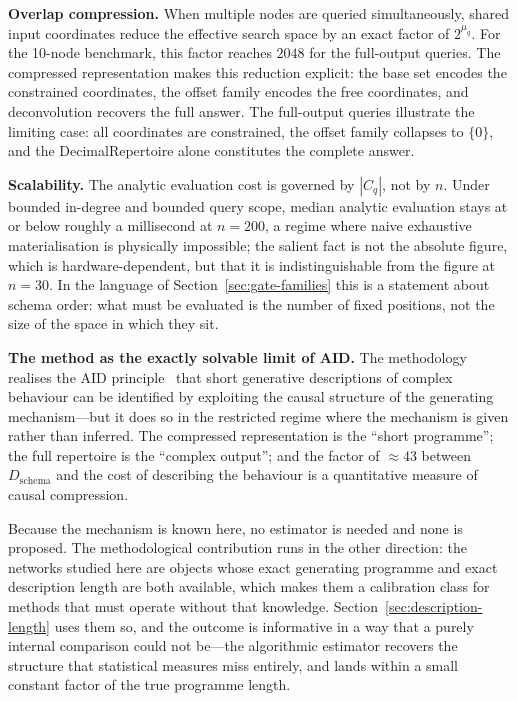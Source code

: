 \documentclass[11pt]{article}
\begin{document}
\textbf{Overlap compression.}  When multiple nodes are queried
simultaneously, shared input coordinates reduce the effective search space
by an exact factor of $2^{\mu_q}$.  For the 10-node benchmark, this factor
reaches $2048$ for the full-output queries.  The compressed representation
makes this reduction explicit: the base set encodes the constrained
coordinates, the offset family encodes the free coordinates, and
deconvolution recovers the full answer.
The full-output queries illustrate the limiting case: all coordinates are
constrained, the offset family collapses to $\{0\}$, and the
DecimalRepertoire alone constitutes the complete answer.

\textbf{Scalability.}  The analytic evaluation cost is governed by
$|C_q|$, not by $n$.  Under bounded in-degree and bounded query scope,
median analytic evaluation stays at or below roughly a millisecond at
$n=200$, a regime where naive exhaustive materialisation is physically
impossible; the salient fact is not the absolute figure, which is
hardware-dependent, but that it is indistinguishable from the figure at
$n=30$.  In the language of
Section~\ref{sec:gate-families} this is a statement about schema order: what
must be evaluated is the number of fixed positions, not the size of the space
in which they sit.

\textbf{The method as the exactly solvable limit of AID.}  The
methodology realises the AID
principle~\cite{zenilcalculus,zenildeconv,zenilaidbook} that short
generative descriptions of complex behaviour can be identified by
exploiting the causal structure of the generating mechanism---but it does so
in the restricted regime where the mechanism is given rather than inferred.
The compressed representation is the ``short programme''; the full
repertoire is the ``complex output''; and the factor of ${\approx}43$ between
$D_{\mathrm{schema}}$ and the cost of describing the behaviour is a
quantitative measure of causal compression.

Because the mechanism is known here, no estimator is needed and none is
proposed.  The methodological contribution runs in the other direction: the
networks studied here are objects whose exact generating programme and exact
description length are both available, which makes them a calibration class
for methods that must operate without that knowledge.
Section~\ref{sec:description-length} uses them so, and the outcome is
informative in a way that a purely internal comparison could not be---the
algorithmic estimator recovers the structure that statistical measures miss
entirely, and lands within a small constant factor of the true programme
length.
\end{document}
